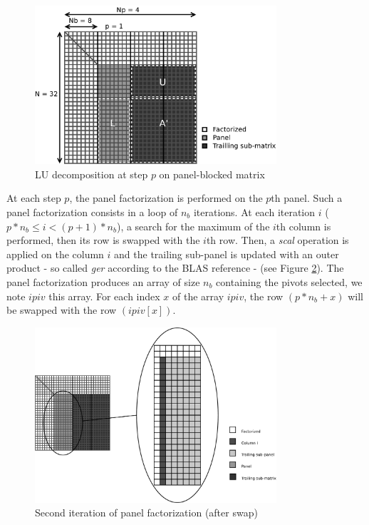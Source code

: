 \begin{figure}[!ht]
\centering
\includegraphics[width=0.8\textwidth]{figures/panel_matrix_bw.pdf}
\caption{LU decomposition at step $p$ on panel-blocked matrix \label{fig:matrix}}
\end{figure}

 
At each step $p$, the panel factorization is performed on the $p$th panel. Such a panel factorization consists in a loop of $n_b$ iterations. At each iteration $i$ ($p*n_b \leq i < (p+1)*n_b$), a search for the maximum of the $i$th column is performed, then its row is swapped with the $i$th row.
Then, a \textit{scal} operation is applied on the column $i$ and the trailing sub-panel is updated with an outer product - so called \textit{ger} according to the BLAS reference - (see Figure \ref{fig:panel}). The panel factorization produces an array of size $n_b$ containing the pivots selected, we note $ipiv$ this array. For each index $x$ of the array $ipiv$, the row $(p*n_b + x)$ will be swapped with the row $(ipiv[x])$.

\begin{figure}[!ht]
\centering
\includegraphics[width=0.8\textwidth]{figures/panel.pdf}
\caption{Second iteration of panel factorization (after swap)\label{fig:panel}}
\end{figure}

